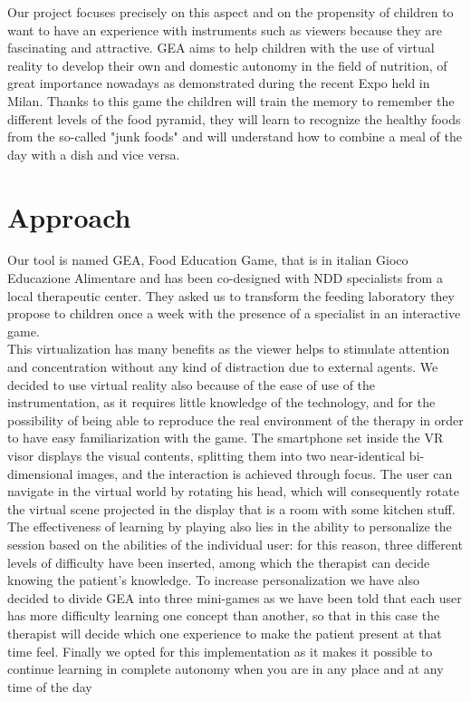 \documentclass{sigchi-ext}
\begin{document}
\medskip
  Our project focuses precisely on this aspect and on the propensity of children to want to have an experience with instruments such as viewers because they are fascinating and attractive. GEA aims to help children with the use of virtual reality to develop their own and domestic autonomy in the field of nutrition, of great importance nowadays as demonstrated during the recent Expo held in Milan. Thanks to this game the children will train the memory to remember the different levels of the food pyramid, they will learn to recognize the healthy foods from the so-called "junk foods" and will understand how to combine a meal of the day with a dish and vice versa.


    
\section{Approach}
Our tool is named GEA, Food Education Game, that is in italian Gioco Educazione Alimentare and has been co-designed with NDD specialists from a local therapeutic center. They asked us to transform the feeding laboratory they propose to children once a week with the presence of a specialist in an interactive game.\\
\medskip
 This virtualization has many benefits as the viewer helps to stimulate attention and concentration without any kind of distraction due to external agents. We decided to use virtual reality also because of the ease of use of the instrumentation, as it requires little knowledge of the technology, and for the possibility of being able to reproduce the real environment of the therapy in order to have easy familiarization with the game. The smartphone set inside the VR visor displays the visual contents, splitting them into two near-identical bi-dimensional images, and the interaction is achieved through focus. The user can navigate in the virtual world by rotating his head, which will consequently rotate the virtual scene projected in the display that is a room with some kitchen stuff.\\
\medskip
  The effectiveness of learning by playing also lies in the ability to personalize the session based on the abilities of the individual user: for this reason, three different levels of difficulty have been inserted, among which the therapist can decide knowing the patient's knowledge. To increase personalization we have also decided to divide GEA into three mini-games as we have been told that each user has more difficulty learning one concept than another, so that in this case the therapist will decide which one experience to make the patient present at that time feel. Finally we opted for this implementation as it makes it possible to continue learning in complete autonomy when you are in any place and at any time of the day
\end{document}
